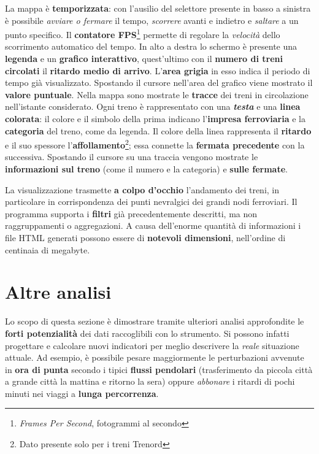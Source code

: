 \documentclass[12pt,a4paper,italian]{report}
\begin{document}
La mappa è \textbf{temporizzata}: con l'ausilio del selettore presente
in basso a sinistra è possibile \textit{avviare o fermare} il tempo,
\textit{scorrere} avanti e indietro e \textit{saltare} a un punto
specifico.  Il \textbf{contatore FPS}\footnote{\textit{Frames Per
        Second}, fotogrammi al secondo} permette di regolare la
\textit{velocità} dello scorrimento automatico del tempo.  In alto a
destra lo schermo è presente una \textbf{legenda} e un \textbf{grafico
    interattivo}, quest'ultimo con il \textbf{numero di treni
    circolati} il \textbf{ritardo medio di arrivo}.  L'\textbf{area
    grigia} in esso indica il periodo di tempo già visualizzato.
Spostando il cursore nell'area del grafico viene mostrato il
\textbf{valore puntuale}.  Nella mappa sono mostrate le
\textbf{tracce} dei treni in circolazione nell'istante considerato.
Ogni treno è rappresentato con una \textbf{\textit{testa}} e una
\textbf{linea colorata}: il colore e il simbolo della prima indicano
l'\textbf{impresa ferroviaria} e la \textbf{categoria} del treno, come
da legenda.  Il colore della linea rappresenta il \textbf{ritardo} e
il suo spessore l'\textbf{affollamento}\footnote{Dato presente solo
    per i treni Trenord}; essa connette la \textbf{fermata precedente}
con la successiva.  Spostando il cursore su una traccia vengono
mostrate le \textbf{informazioni sul treno} (come il numero e la
categoria) e \textbf{sulle fermate}.

La visualizzazione trasmette \textbf{a colpo d'occhio} l'andamento dei
treni, in particolare in corrispondenza dei punti nevralgici dei
grandi nodi ferroviari.  Il programma supporta i \textbf{filtri} già
precedentemente descritti, ma non raggruppamenti o aggregazioni.  A
causa dell'enorme quantità di informazioni i file HTML generati
possono essere di \textbf{notevoli dimensioni}, nell'ordine di
centinaia di megabyte.

\section{Altre analisi}
\label{altre_analisi}

Lo scopo di questa sezione è dimostrare tramite ulteriori analisi
approfondite le \textbf{forti potenzialità} dei dati raccoglibili con
lo strumento.  Si possono infatti progettare e calcolare nuovi
indicatori per meglio descrivere la \textit{reale} situazione attuale.
Ad esempio, è possibile pesare maggiormente le perturbazioni avvenute
in \textbf{ora di punta} secondo i tipici \textbf{flussi pendolari}
(trasferimento da piccola città a grande città la mattina e ritorno la
sera) oppure \textit{abbonare} i ritardi di pochi minuti nei viaggi a
\textbf{lunga percorrenza}.
\end{document}

